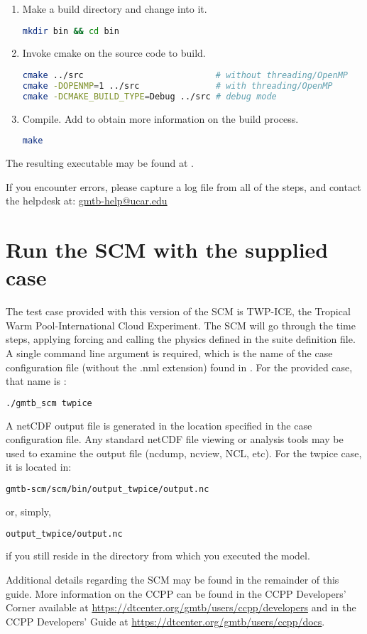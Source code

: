 \begin{enumerate}
    \item Make a build directory and change into it.
\begin{lstlisting}[language=bash]
mkdir bin && cd bin
\end{lstlisting}
    \item Invoke cmake on the source code to build.
\begin{lstlisting}[language=bash]
cmake ../src                          # without threading/OpenMP
cmake -DOPENMP=1 ../src               # with threading/OpenMP
cmake -DCMAKE_BUILD_TYPE=Debug ../src # debug mode
\end{lstlisting}
    \item Compile. Add  to obtain more information on the build process.
\begin{lstlisting}[language=bash]
make
\end{lstlisting}
\end{enumerate}

The resulting executable may be found at .

If you encounter errors, please capture a log file from all of the steps, and contact the helpdesk at: \url{gmtb-help@ucar.edu}

\section{Run the SCM with the supplied case} 
The test case provided with this version of the SCM is TWP-ICE, the Tropical Warm Pool-International Cloud Experiment. The SCM will go through the time steps, applying forcing and calling the physics defined in the suite definition file. A single command line argument is required, which is the name of the case configuration file (without the .nml extension) found in . For the provided case, that name is :
\begin{lstlisting}[language=bash]
./gmtb_scm twpice
\end{lstlisting}
A netCDF output file is generated in the location specified in the case
configuration file. Any standard netCDF file viewing or analysis tools may be used to 
examine the output file (ncdump, ncview, NCL, etc).  For the twpice case, it is located in:
\begin{lstlisting}[language=bash]
gmtb-scm/scm/bin/output_twpice/output.nc
\end{lstlisting}
or, simply,
\begin{lstlisting}[language=bash]
output_twpice/output.nc
\end{lstlisting}
if you still reside in the  directory from which you executed the model.

Additional details regarding the SCM may be found in the remainder of this guide. More information on the CCPP can be found in the CCPP Developers' Corner available at \url{https://dtcenter.org/gmtb/users/ccpp/developers} and in the CCPP Developers' Guide at \url{https://dtcenter.org/gmtb/users/ccpp/docs}.
